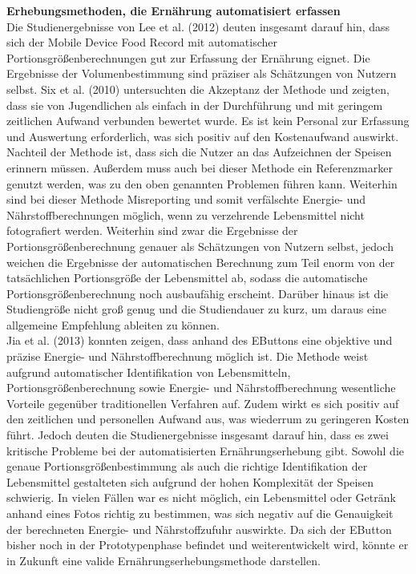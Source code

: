 \textbf{Erhebungsmethoden, die Ernährung automatisiert erfassen}\\
Die Studienergebnisse von Lee et al. (2012) deuten insgesamt darauf hin, dass sich der Mobile Device Food Record mit automatischer Portionsgrößenberechnungen gut zur Erfassung der Ernährung eignet. Die Ergebnisse der Volumenbestimmung sind präziser als Schätzungen von Nutzern selbst. Six et al. (2010) untersuchten die Akzeptanz der Methode und zeigten, dass sie von Jugendlichen als einfach in der Durchführung und mit geringem zeitlichen Aufwand verbunden bewertet wurde. Es ist kein Personal zur Erfassung und Auswertung erforderlich, was sich positiv auf den Kostenaufwand auswirkt. 
Nachteil der Methode ist, dass sich die Nutzer an das Aufzeichnen der Speisen erinnern müssen. Außerdem muss auch bei dieser Methode ein Referenzmarker genutzt werden, was zu den oben genannten Problemen führen kann. Weiterhin sind bei dieser Methode Misreporting und somit verfälschte Energie- und Nährstoffberechnungen möglich, wenn zu verzehrende Lebensmittel nicht fotografiert werden. Weiterhin sind zwar die Ergebnisse der Portionsgrößenberechnung genauer als Schätzungen von Nutzern selbst, jedoch weichen die Ergebnisse der automatischen Berechnung zum Teil enorm von der tatsächlichen Portionsgröße der Lebensmittel ab, sodass die automatische Portionsgrößenberechnung noch ausbaufähig erscheint. Darüber hinaus ist die Studiengröße nicht groß genug und die Studiendauer zu kurz, um daraus eine allgemeine Empfehlung ableiten zu können. \\
Jia et al. (2013) konnten zeigen, dass anhand des EButtons eine objektive und präzise Energie- und Nährstoffberechnung möglich ist. Die Methode weist aufgrund automatischer Identifikation von Lebensmitteln, Portionsgrößenberechnung sowie Energie- und Nährstoffberechnung wesentliche Vorteile gegenüber traditionellen Verfahren auf. Zudem wirkt es sich positiv auf den zeitlichen und personellen Aufwand aus, was wiederrum zu geringeren Kosten führt. 
Jedoch deuten die Studienergebnisse insgesamt darauf hin, dass es zwei kritische Probleme bei der automatisierten Ernährungserhebung gibt. Sowohl die genaue Portionsgrößenbestimmung als auch die richtige Identifikation der Lebensmittel gestalteten sich aufgrund der hohen Komplexität der Speisen schwierig. In vielen Fällen war es nicht möglich, ein Lebensmittel oder Getränk anhand eines Fotos richtig zu bestimmen, was sich negativ auf die Genauigkeit der berechneten Energie- und Nährstoffzufuhr auswirkte. Da sich der EButton bisher noch in der Prototypenphase befindet und weiterentwickelt wird, könnte er in Zukunft eine valide Ernährungserhebungsmethode darstellen.\\
